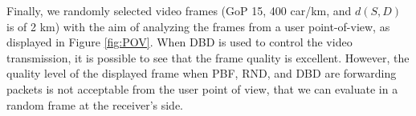 \documentclass{acm_proc_article-sp}
\begin{document}
Finally, we randomly selected video frames (GoP 15, 400 car/km, and $d(S,D)$ is of 2 km) with the aim of analyzing the frames from a user point-of-view, as displayed in Figure \ref{fig:POV}. When DBD is used to control the video transmission, it is possible to see that the frame quality is excellent. However, the quality level of the displayed frame when PBF, RND, and DBD are forwarding packets is not acceptable from the user point of view, that we can evaluate in a random frame at the receiver's side.


\begin{figure}[!t]
	\begin{center} 

\end{center}
\end{figure}
\end{document}
